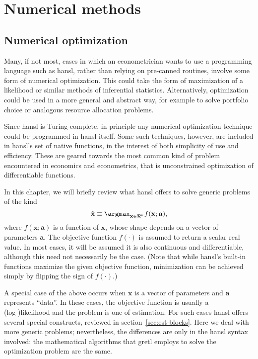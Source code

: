\chapter{Numerical methods}
\label{chap:numerical}

\section{Numerical optimization}
\label{sec:hp-numopt}

Many, if not most, cases in which an econometrician wants to use a
programming language such as hansl, rather than relying on pre-canned
routines, involve some form of numerical optimization. This could take
the form of maximization of a likelihood or similar methods of
inferential statistics. Alternatively, optimization could be used in a
more general and abstract way, for example to solve portfolio choice
or analogous resource allocation problems.

Since hansl is Turing-complete, in principle any numerical
optimization technique could be programmed in hansl itself. Some such
techniques, however, are included in hansl's set of native
functions, in the interest of both simplicity of use and
efficiency. These are geared towards the most common kind of problem
encountered in economics and econometrics, that is unconstrained
optimization of differentiable functions.

In this chapter, we will briefly review what hansl offers to solve
generic problems of the kind
\[
\hat{\mathbf{x}} \equiv \argmax_{\mathbf{x} \in \Re^k} f(\mathbf{x}; \mathbf{a}),
\]
where $f(\mathbf{x}; \mathbf{a})$ is a function of $\mathbf{x}$, whose
shape depends on a vector of parameters $\mathbf{a}$. The objective
function $f(\cdot)$ is assumed to return a scalar real value. In most
cases, it will be assumed it is also continuous and differentiable,
although this need not necessarily be the case. (Note that while
hansl's built-in functions maximize the given objective function,
minimization can be achieved simply by flipping the sign of
$f(\cdot)$.)

A special case of the above occurs when $\mathbf{x}$ is a vector of
parameters and $\mathbf{a}$ represents ``data''. In these cases, the
objective function is usually a (log-)likelihood and the problem is
one of estimation. For such cases hansl offers several special
constructs, reviewed in section~\ref{sec:est-blocks}. Here we deal
with more generic problems; nevertheless, the differences are only in
the hansl syntax involved: the mathematical algorithms that gretl
employs to solve the optimization problem are the same.

